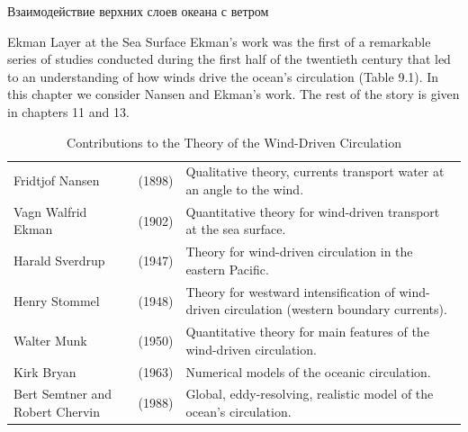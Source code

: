 \begin{chapter}{Взаимодействие верхних слоев океана с ветром}
\begin{section}{Ekman Layer at the Sea Surface}
Ekman's work was the first of a remarkable series of studies conducted
during the first half of the twentieth century that led to an
understanding of how winds drive the ocean's circulation (Table
9.1). In this chapter we consider Nansen and Ekman's work. The rest of
the story is given in chapters 11 and 13.
%

\begin{table}[t!]
\caption{Contributions to the Theory of the Wind-Driven Circulation}
\begin{tabular}{lcl}
\hline
Fridtjof Nansen     & (1898) 
  & Qualitative theory, currents transport water at an angle to the wind. \\
Vagn Walfrid Ekman  & (1902)    
  & Quantitative theory for wind-driven transport\index{transport!wind-driven} at 
    the sea surface. \\
Harald Sverdrup     & (1947)
  & Theory for wind-driven circulation in the eastern Pacific. \\
Henry Stommel   & (1948)     
  & Theory for westward intensification of wind-driven circulation 
    (western boundary currents). \\
Walter Munk  & (1950)
  & Quantitative theory for main features of the wind-driven circulation. \\
Kirk Bryan  & (1963)
  & Numerical models of the oceanic circulation. \\
Bert Semtner and Robert Chervin & (1988) 
  & Global, eddy-resolving, realistic model of the ocean's circulation. \\
\hline
\end{tabular}
\end{table}
%

\end{section}
\end{chapter}
